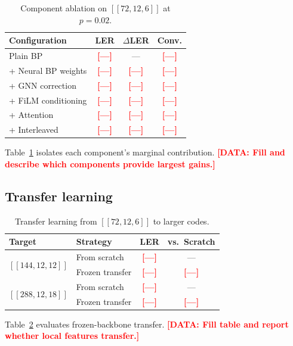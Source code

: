 \documentclass[a4paper,twocolumn,11pt,unpublished,nopdfoutputerror]{quantumarticle}
\newcommand{\code}[3]{\ensuremath{[\![#1,#2,#3]\!]}}
\newcommand{\pending}[1]{\textcolor{red}{\textbf{[#1]}}}
\begin{document}
\begin{table}[t]
\centering
\caption{Component ablation on $\code{72}{12}{6}$ at $p = 0.02$.}
\label{tab:ablation}
\begin{tabular}{@{}lccc@{}}
\toprule
Configuration & LER & $\Delta$LER & Conv. \\
\midrule
Plain BP & \pending{---} & --- & \pending{---} \\
\; + Neural BP weights & \pending{---} & \pending{---} & \pending{---} \\
\; + GNN correction & \pending{---} & \pending{---} & \pending{---} \\
\; + FiLM conditioning & \pending{---} & \pending{---} & \pending{---} \\
\; + Attention & \pending{---} & \pending{---} & \pending{---} \\
\; + Interleaved & \pending{---} & \pending{---} & \pending{---} \\
\bottomrule
\end{tabular}
\end{table}

Table~\ref{tab:ablation} isolates each component's marginal contribution. \pending{DATA: Fill and describe which components provide largest gains.}

\subsection{Transfer learning}

\begin{table}[t]
\centering
\caption{Transfer learning from $\code{72}{12}{6}$ to larger codes.}
\label{tab:transfer}
\begin{tabular}{@{}llcc@{}}
\toprule
Target & Strategy & LER & vs.\ Scratch \\
\midrule
\multirow{2}{*}{$\code{144}{12}{12}$} & From scratch & \pending{---} & --- \\
& Frozen transfer & \pending{---} & \pending{---} \\
\midrule
\multirow{2}{*}{$\code{288}{12}{18}$} & From scratch & \pending{---} & --- \\
& Frozen transfer & \pending{---} & \pending{---} \\
\bottomrule
\end{tabular}
\end{table}

Table~\ref{tab:transfer} evaluates frozen-backbone transfer. \pending{DATA: Fill table and report whether local features transfer.}
\end{document}
